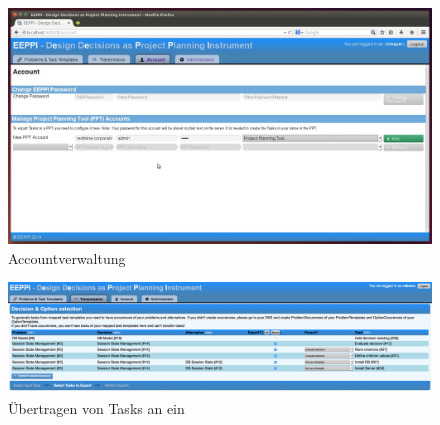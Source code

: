 		\begin{figure}[H]
			\centering
			\includegraphics[width=\linewidth]{tutorial/img/accountPPTAccount.jpg}
			\caption{Accountverwaltung}
			\label{fig:eeppiAccountManagement}
		\end{figure}	
			
		\begin{figure}[H]
			\centering
			\includegraphics[width=\linewidth]{tutorial/img/transmit2.png}
			\caption{Übertragen von Tasks an ein \ppt}
			\label{fig:eeppiTransmitTasks}
		\end{figure}	